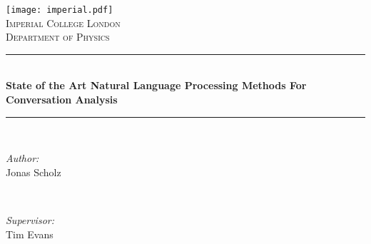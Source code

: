 \begin{titlepage}

\newcommand{\HRule}{\rule{\linewidth}{0.5mm}} %



\texttt{[image: imperial.pdf]}\\[0.5cm] 



\center %
\textsc{\Large Imperial College London}\\[0.5cm] 
\textsc{\large Department of Physics}\\[0.5cm] 

\HRule \\[0.4cm]
\fontsize{30pt}{28pt}\selectfont\bfseries State of the Art Natural Language Processing Methods For Conversation Analysis %
\HRule \\[1.5cm]
 

\begin{minipage}{0.4\textwidth}
\begin{flushleft} \large
\emph{Author:}\\
Jonas Scholz
\end{flushleft}
\end{minipage}
~
\begin{minipage}{0.4\textwidth}
\begin{flushright} \large
\emph{Supervisor:} \\
Tim Evans
\end{flushright}
\end{minipage}\\[4cm]


\vfill %

\end{titlepage}
